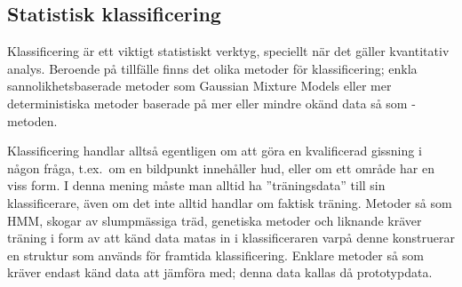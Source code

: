 \documentclass[../rapport_MVEX01-11-05]{subfiles}
\begin{document}
\subsection{Statistisk klassificering}\label{sec:klassificering}

Klassificering är ett viktigt statistiskt verktyg, speciellt när det gäller
kvantitativ analys. Beroende på tillfälle finns det olika metoder för
klassificering; enkla sannolikhetsbaserade metoder som Gaussian Mixture
Models eller mer deterministiska metoder baserade på mer eller mindre
okänd data så som \knn-metoden.

Klassificering handlar alltså egentligen om att göra en kvalificerad gissning
i någon fråga, t.ex.~om en bildpunkt innehåller hud, eller om ett område har
en viss form. I denna mening måste man alltid ha ''träningsdata'' till sin
klassificerare, även om det inte alltid handlar om faktisk träning. Metoder
så som HMM, skogar av slumpmässiga träd, genetiska metoder och liknande kräver
träning i form av att känd data matas in i klassificeraren varpå denne
konstruerar en struktur som används för framtida klassificering.
Enklare metoder så som \knn 
kräver endast känd data att jämföra med; denna data kallas då prototypdata.

\end{document}
